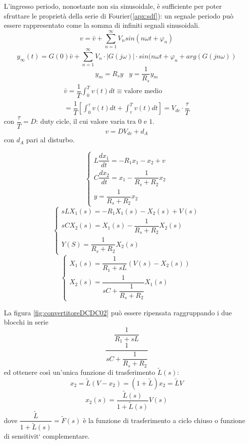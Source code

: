 \documentclass[a4paper]{report}
\begin{document}
L'ingresso periodo, nonostante non sia sinusoidale, \`e sufficiente
per poter sfruttare le propriet\`a della serie di
Fourier(\ref{apx:sdf}): un segnale periodo pu\`o essere rappresentato
come la somma di infiniti segnali sinusoidali.
\[
v = \bar{v} + \sum_{n=1}^{\infty} V_n sin(n \omega t + \varphi_n)
\]
\[
y_{\infty}(t) = G(0) \bar{v} + \sum_{n=1}^{\infty} V_n \cdot
|G(j\omega)| \cdot sin(n \omega t + \varphi_{n} + arg(G(j n \omega))
\]
\[
y_m = R_s y \;\;\; y = \dfrac{1}{R_s} y_m
\]
\[
\begin{array}{l}
  \bar{v} = \dfrac{1}{T} \int_0^T v(t) dt \equiv \textrm{valore
    medio}\\
  = \dfrac{1}{T} \left[ \int_0^{\tau} v(t) dt + \int_{\tau}^T v(t) dt
    \right] = V_{dc} \cdot \dfrac{\tau}{T}
\end{array}
\]
con $\dfrac{\tau}{T} = D$: duty cicle, il cui valore
varia tra $0$ e $1$.
\[
v = D V_{dc} + d_A
\]
con $d_A$ pari al disturbo.

\[
\left\{
\begin{array}{l}
  L \dfrac{dx_1}{dt} = - R_1 x_1 - x_2 + v\\
  C \dfrac{dx_2}{dt} = x_1 - \dfrac{1}{R_s + R_2}x_2\\
  y = \dfrac{1}{R_s + R_2}x_2
\end{array}
\right .
\]
\[
\left\{
\begin{array}{l}
  sLX_1(s) = -R_1 X_1(s) - X_2(s) + V(s)\\
  sCX_2(s) = X_1(s) - \dfrac{1}{R_s + R_2}X_2(s)\\
  Y(S) = \dfrac{1}{R_s + R_2}X_2(s)
\end{array}
\right .
\]
\[
\left\{
\begin{array}{l}
 X_1(s) = \dfrac{1}{R_1 + sL} (V(s) - X_2(s))\\
 X_2(s) = \dfrac{1}{sC + \dfrac{1}{R_s + R_2}} X_1(s)
\end{array}
\right .
\]

La figura \ref{fig:convertitoreDCDC02} pu\`o essere ripensata
raggruppando i due blocchi in serie
\[
\dfrac{1}{R_1 + sL}
\]
\[
\dfrac{1}{sC + \dfrac{1}{R_s + R_2}}
\]
ed ottenere cos\`i un'unica funzione di trasferimento $\tilde{L}(s)$:
\[
x_2 = \tilde{L}(V - x_2) = (1 + \tilde{L}) x_2 = \tilde{L}V
\]
\[
x_2(s) = \dfrac{\tilde{L}(s)}{1 + \tilde{L}(s)} V(s)
\]
dove $\dfrac{\tilde{L}}{1 + \tilde{L}(s)} = \tilde{F}(s)$ \`e la
funzione di trasferimento a ciclo chiuso o funzione di sensitivit\a`
complementare.
\end{document}
